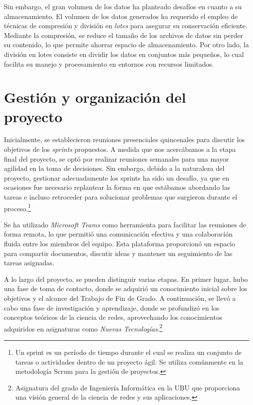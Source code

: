 Sin embargo, el gran volumen de los datos ha planteado desafíos en cuanto a su almacenamiento. 
El volumen de los datos generados ha requerido el empleo de técnicas de compresión y división 
en \textit{lotes} para asegurar su conservación eficiente. Mediante la compresión, se reduce el tamaño 
de los archivos de datos sin perder su contenido, lo que permite ahorrar espacio de 
almacenamiento. Por otro lado, la división 
en lotes consiste en dividir los datos en conjuntos más pequeños, lo cual facilita su manejo y 
procesamiento en entornos con recursos limitados.

\section{Gestión y organización del proyecto}

Inicialmente, se establecieron reuniones presenciales quincenales para discutir los objetivos de 
los \textit{sprints} propuestos. A medida que nos acercábamos a la etapa final del proyecto, se optó por 
realizar reuniones semanales para una mayor agilidad en la toma de decisiones. Sin embargo, debido 
a la naturaleza del proyecto, gestionar adecuadamente los sprints ha sido un desafío, ya que en 
ocasiones fue necesario replantear la forma en que estábamos abordando las tareas e incluso 
retroceder para solucionar problemas que surgieron durante el proceso.\footnote{Un sprint es un 
período de tiempo durante el cual se realiza un conjunto de tareas o actividades dentro de un 
proyecto ágil. Se utiliza comúnmente en la metodología Scrum para la gestión de proyectos.}

Se ha utilizado \textit{Microsoft Teams} como herramienta para facilitar las reuniones de forma remota, 
lo que permitió una comunicación efectiva y una colaboración fluida entre los miembros del equipo. 
Esta plataforma proporcionó un espacio para compartir documentos, discutir ideas y mantener un 
seguimiento de las tareas asignadas.

A lo largo del proyecto, se pueden distinguir varias etapas. En primer lugar, hubo una fase de 
toma de contacto, donde se adquirió un conocimiento inicial sobre los objetivos y el alcance del 
Trabajo de Fin de Grado. A continuación, se llevó a cabo una fase de investigación y aprendizaje, 
donde se profundizó en los conceptos teóricos de la ciencia de redes, aprovechando los conocimientos 
adquiridos en asignaturas como \textit{Nuevas Tecnologías}.\footnote{Asignatura del grado de Ingeniería 
Informática en la UBU que proporciona una visión general de la ciencia de redes y sus aplicaciones.}

